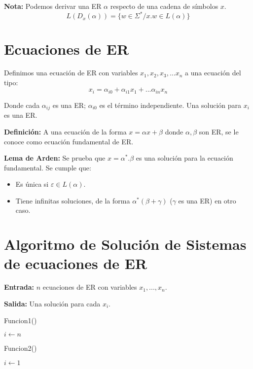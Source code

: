 \textbf{Nota: }Podemos derivar una ER $\alpha$ respecto de una cadena de símbolos $x$.
$$L(D_x(\alpha))=\{ w\in \Sigma^* / x.w\in L(\alpha)\}$$

\section{Ecuaciones de ER}

Definimos una ecuación de ER con variables $x_1,x_2,x_3,...x_n$ a una ecuación del tipo:
$$x_i=\alpha_{i0} +\alpha_{i1}x_1+...\alpha_{in}x_n$$

Donde cada $\alpha_{ij}$ es una ER; $\alpha_{i0}$ es el término independiente. Una solución para $x_i$ es una ER.

\textbf{Definición: }A una ecuación de la forma $x=\alpha x+\beta$ donde $\alpha,\beta$ son ER, se le conoce como ecuación fundamental de ER.

\textbf{Lema de Arden: }Se prueba que $x=\alpha^* .\beta$ es una solución para la ecuación fundamental. Se cumple que:
\begin{itemize}
 \item Es única si $\varepsilon\in L(\alpha)$.
 \item Tiene infinitas soluciones, de la forma $\alpha^*(\beta+\gamma)$ ($\gamma$ es una ER) en otro caso.
\end{itemize}

\section{Algoritmo de Solución de Sistemas de ecuaciones de ER}

\textbf{Entrada: }$n$ ecuaciones de ER con variables $x_1,...,x_n$.

\textbf{Salida: }Una solución para cada $x_i$.

\begin{algorithm}[!h]
\caption{Funcion1()\label{alg1}}
$i \leftarrow n $\\
\end{algorithm}

\begin{algorithm}[!h]
\caption{Funcion2()\label{alg2}}
$i\leftarrow 1$\\
\end{algorithm}

